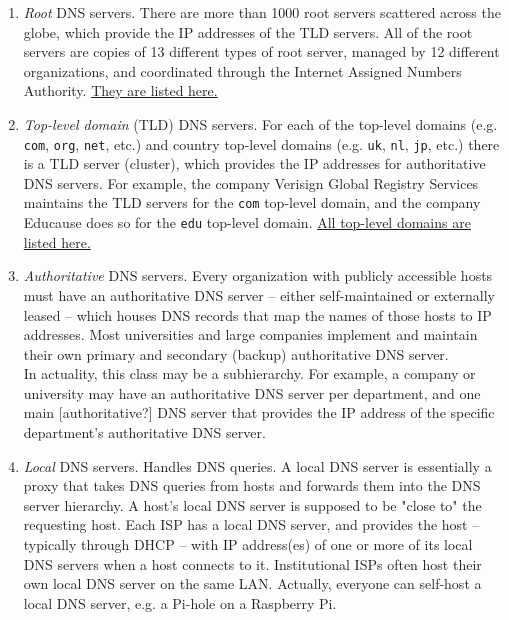 \documentclass[8pt, table, xcdraw]{article}%
\begin{document}
\begin{enumerate}
    \item \emph{Root} DNS servers. There are more than 1000 root servers scattered across the globe, which provide the IP addresses of the TLD servers. All of the root servers are copies of 13 different types of root server, managed by 12 different organizations, and coordinated through the Internet Assigned Numbers Authority. \href{https://root-servers.org/}{They are listed here.}
    \item \emph{Top-level domain} (TLD) DNS servers. For each of the top-level domains (e.g. \texttt{com}, \texttt{org}, \texttt{net}, etc.) and country top-level domains (e.g. \texttt{uk}, \texttt{nl}, \texttt{jp}, etc.) there is a TLD server (cluster), which provides the IP addresses for authoritative DNS servers. For example, the company Verisign Global Registry Services maintains the TLD servers for the \texttt{com} top-level domain, and the company Educause does so for the \texttt{edu} top-level domain. \href{https://en.wikipedia.org/wiki/
List_of_Internet_top-level_domains}{All top-level domains are listed here.}
    \item \emph{Authoritative} DNS servers. Every organization with publicly accessible hosts must have an authoritative DNS server -- either self-maintained or externally leased -- which houses DNS records that map the names of those hosts to IP addresses. Most universities and large companies implement and maintain their own primary and secondary (backup) authoritative DNS server.\\
    In actuality, this class may be a subhierarchy. For example, a company or university may have an authoritative DNS server per department, and one main [authoritative?] DNS server that provides the IP address of the specific department's authoritative DNS server.
    \item[\textbullet] \emph{Local} DNS servers. Handles DNS queries. A local DNS server is essentially a proxy that takes DNS queries from hosts and forwards them into the DNS server hierarchy. A host’s local DNS server is supposed to be "close to" the requesting host. Each ISP has a local DNS server, and provides the host --typically through DHCP -- with IP address(es) of one or more of its local DNS servers when a host connects to it. Institutional ISPs often host their own local DNS server on the same LAN. Actually, everyone can self-host a local DNS server, e.g. a Pi-hole on a Raspberry Pi.
\end{enumerate}
\end{document}
